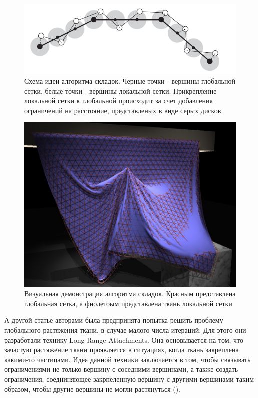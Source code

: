 	\begin{figure}[ht!] 
		\center
		\includegraphics [scale=1] {my_folder/images//wrincle_mesh_idea}
		\caption{Схема идеи алгоритма складок. Черные точки - вершины глобальной сетки, белые точки - вершины локальной сетки. Прикрепление локальной сетки к глобальной происходит за счет добавления ограничений на расстояние, представленых в виде серых дисков}
		\label{fig:wrincle-idea}  
	\end{figure}
	
		
	\begin{figure}[ht!] 
		\center
		\includegraphics [scale=0.7] {my_folder/images//wrincle_mesh_show}
		\caption{Визуальная демонстрация алгоритма складок. Красным представлена глобальная сетка, а фиолетоым представлена ткань локальной сетки}
		\label{fig:wrincle-show}  
	\end{figure}
	
	А другой статье \cite{kim2012long} авторами была предпринята попытка решить проблему глобального растяжения ткани, в случае малого числа итераций. Для этого они разработали технику Long Range Attachments. Она основывается на том, что зачастую растяжение ткани проявляется в ситуациях, когда ткань закреплена какими-то частицами. Идея данной техники заключается в том, чтобы связывать ограничениями не только вершину с соседними вершинами, а также создать ограничения, соедниняющее закрпеленную вершину с другими вершинами таким образом, чтобы другие вершины не могли растянуться ().
	
